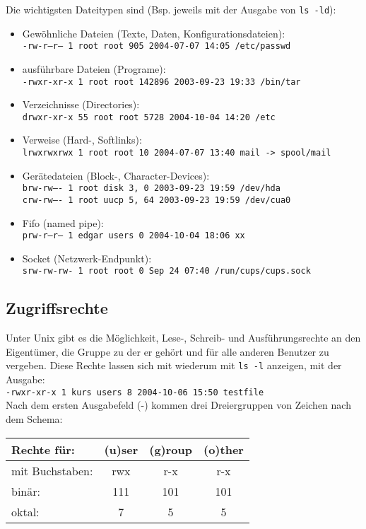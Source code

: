 \documentclass[11pt]{article}
\begin{document}
Die wichtigsten Dateitypen sind (Bsp. jeweils mit der Ausgabe von
\texttt{ls -ld}):
\begin{itemize}
\item Gewöhnliche Dateien (Texte, Daten, Konfigurationsdateien):\\
\texttt{-rw-r--r--    1 root     root          905 2004-07-07 14:05
/etc/passwd}
\item ausführbare Dateien (Programe): \\
\texttt{-rwxr-xr-x    1 root     root       142896 2003-09-23 19:33
/bin/tar}
\item Verzeichnisse (Directories): \\
\texttt{drwxr-xr-x   55 root     root         5728 2004-10-04 14:20
/etc}
\item Verweise (Hard-, Softlinks): \\
\texttt{lrwxrwxrwx    1 root     root           10 2004-07-07 13:40 mail
-> spool/mail}
\item Gerätedateien (Block-, Character-Devices): \\
\texttt{brw-rw----    1 root     disk       3,   0 2003-09-23 19:59
/dev/hda} \\
\texttt{crw-rw----    1 root     uucp       5,  64 2003-09-23 19:59
/dev/cua0}
\item Fifo (named pipe): \\
\texttt{prw-r--r--    1 edgar    users           0 2004-10-04 18:06 xx}
\item Socket (Netzwerk-Endpunkt): \\
\texttt{srw-rw-rw- 1 root root 0 Sep 24 07:40 /run/cups/cups.sock}
\end{itemize}


\subsection{Zugriffsrechte}
Unter Unix gibt es die Möglichkeit, Lese-, Schreib- und
Ausführungsrechte an den Eigentümer, die Gruppe zu der er gehört und
für alle anderen Benutzer zu vergeben. Diese Rechte lassen sich mit
wiederum mit \texttt{ls -l} anzeigen, mit der Ausgabe: \\

\texttt{-rwxr-xr-x    1 kurs     users           8 2004-10-06 15:50 testfile } \\

Nach dem ersten Ausgabefeld (-) kommen drei Dreiergruppen von Zeichen
nach dem Schema:

\begin{tabular}{|l|c|c|c|}
\hline
Rechte für: & (u)ser & (g)roup & (o)ther \\
\hline
\hline
mit Buchstaben: & rwx & r-x & r-x \\ 
binär: & 111 & 101 & 101  \\
oktal: & 7 & 5 & 5 \\
\hline
\end{tabular}\\
\end{document}
